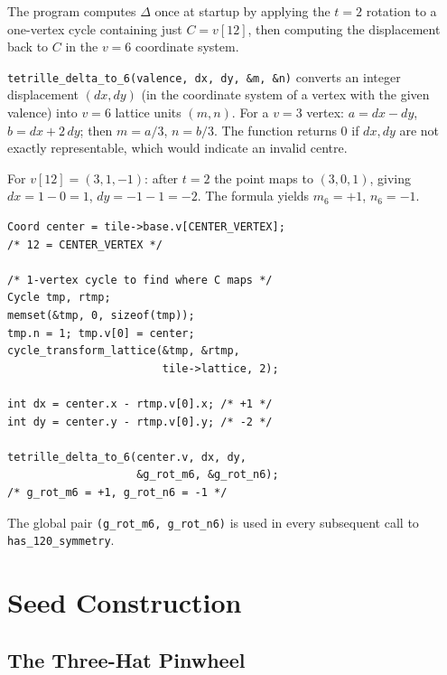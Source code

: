 \documentclass[10pt,a4paper]{article}
\let\polysection\section
\renewcommand\section{\needspace{0.16\textheight}\polysection}
\let\polysubsection\subsection
\renewcommand\subsection{\needspace{0.12\textheight}\polysubsection}
\newcommand{\code}[1]{\texttt{\small #1}}
\begin{document}
\begin{tcolorbox}[dualbox, title={Translation computation in \code{build\_symmetric\_seed}}]
  The program computes $\Delta$ once at startup by applying the $t=2$
  rotation to a one-vertex cycle containing just $C = v[12]$, then
  computing the displacement back to $C$ in the $v=6$ coordinate system.

  \code{tetrille\_delta\_to\_6(valence, dx, dy, \&m, \&n)} converts an
  integer displacement $(dx, dy)$ (in the coordinate system of a vertex
  with the given valence) into $v=6$ lattice units $(m, n)$.  For
  a $v=3$ vertex: $a = dx - dy$, $b = dx + 2\,dy$; then $m = a/3$,
  $n = b/3$.  The function returns 0 if $dx, dy$ are not exactly
  representable, which would indicate an invalid centre.

  For $v[12] = (3, 1, -1)$: after $t=2$ the point maps to $(3, 0, 1)$,
  giving $dx = 1 - 0 = 1$, $dy = -1 - 1 = -2$.  The formula yields
  $m_6 = +1$, $n_6 = -1$.
\tcblower
\begin{verbatim}
Coord center = tile->base.v[CENTER_VERTEX];
/* 12 = CENTER_VERTEX */

/* 1-vertex cycle to find where C maps */
Cycle tmp, rtmp;
memset(&tmp, 0, sizeof(tmp));
tmp.n = 1; tmp.v[0] = center;
cycle_transform_lattice(&tmp, &rtmp,
                        tile->lattice, 2);

int dx = center.x - rtmp.v[0].x; /* +1 */
int dy = center.y - rtmp.v[0].y; /* -2 */

tetrille_delta_to_6(center.v, dx, dy,
                    &g_rot_m6, &g_rot_n6);
/* g_rot_m6 = +1, g_rot_n6 = -1 */
\end{verbatim}
\end{tcolorbox}

\noindent The global pair \code{(g\_rot\_m6, g\_rot\_n6)} is used in every
subsequent call to \code{has\_120\_symmetry}.

\section{Seed Construction}

\subsection{The Three-Hat Pinwheel}
\end{document}
